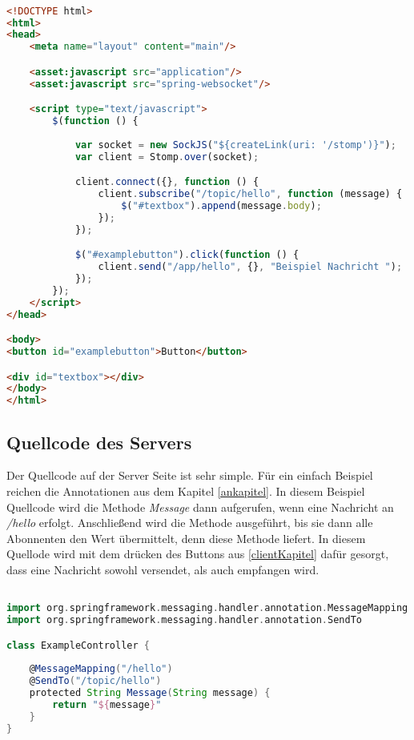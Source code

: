 \begin{lstlisting}[language=HTML,caption={GSP Code des Clients}, label=listingClient]

<!DOCTYPE html>
<html>
<head>
    <meta name="layout" content="main"/>

    <asset:javascript src="application"/>
    <asset:javascript src="spring-websocket"/>

    <script type="text/javascript">
        $(function () {
        
            var socket = new SockJS("${createLink(uri: '/stomp')}");
            var client = Stomp.over(socket);

            client.connect({}, function () {
                client.subscribe("/topic/hello", function (message) {
                    $("#textbox").append(message.body);
                });
            });

            $("#examplebutton").click(function () {
                client.send("/app/hello", {}, "Beispiel Nachricht ");
            });
        });
    </script>
</head>

<body>
<button id="examplebutton">Button</button>

<div id="textbox"></div>
</body>
</html>

\end{lstlisting}

\subsection{Quellcode des Servers}

Der Quellcode auf der Server Seite ist sehr simple. Für ein einfach Beispiel reichen die Annotationen aus dem Kapitel \ref{ankapitel}. In diesem Beispiel Quellcode wird die Methode \textit{Message} dann aufgerufen, wenn eine Nachricht an \textit{/hello} erfolgt. Anschließend wird die Methode ausgeführt, bis sie dann alle Abonnenten den Wert übermittelt, denn diese Methode liefert. 
In diesem Quellode wird mit dem drücken des Buttons aus \ref{clientKapitel} dafür gesorgt, dass eine Nachricht sowohl versendet, als auch empfangen wird.

\begin{lstlisting}[language=Groovy,caption={Beispiel der Controller Klasse}, label=listingexampleControllerClass]

import org.springframework.messaging.handler.annotation.MessageMapping
import org.springframework.messaging.handler.annotation.SendTo

class ExampleController {
	
	@MessageMapping("/hello")
	@SendTo("/topic/hello")
	protected String Message(String message) {
		return "${message}"
	}	
}
\end{lstlisting}



